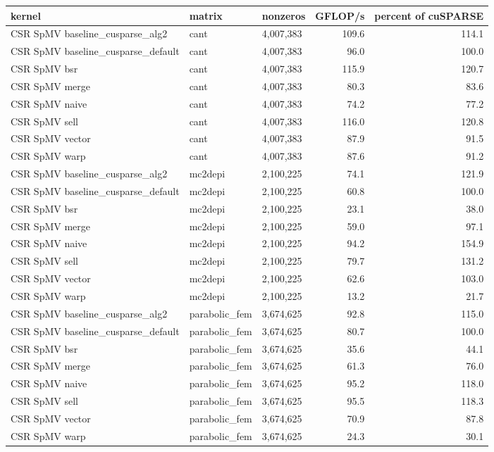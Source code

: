 \begin{tabular}{lllrr}
\toprule
kernel & matrix & nonzeros & GFLOP/s & percent of cuSPARSE \\
\midrule
CSR SpMV baseline\_cusparse\_alg2 & cant & 4,007,383 & 109.6 & 114.1 \\
CSR SpMV baseline\_cusparse\_default & cant & 4,007,383 & 96.0 & 100.0 \\
CSR SpMV bsr & cant & 4,007,383 & 115.9 & 120.7 \\
CSR SpMV merge & cant & 4,007,383 & 80.3 & 83.6 \\
CSR SpMV naive & cant & 4,007,383 & 74.2 & 77.2 \\
CSR SpMV sell & cant & 4,007,383 & 116.0 & 120.8 \\
CSR SpMV vector & cant & 4,007,383 & 87.9 & 91.5 \\
CSR SpMV warp & cant & 4,007,383 & 87.6 & 91.2 \\
CSR SpMV baseline\_cusparse\_alg2 & mc2depi & 2,100,225 & 74.1 & 121.9 \\
CSR SpMV baseline\_cusparse\_default & mc2depi & 2,100,225 & 60.8 & 100.0 \\
CSR SpMV bsr & mc2depi & 2,100,225 & 23.1 & 38.0 \\
CSR SpMV merge & mc2depi & 2,100,225 & 59.0 & 97.1 \\
CSR SpMV naive & mc2depi & 2,100,225 & 94.2 & 154.9 \\
CSR SpMV sell & mc2depi & 2,100,225 & 79.7 & 131.2 \\
CSR SpMV vector & mc2depi & 2,100,225 & 62.6 & 103.0 \\
CSR SpMV warp & mc2depi & 2,100,225 & 13.2 & 21.7 \\
CSR SpMV baseline\_cusparse\_alg2 & parabolic\_fem & 3,674,625 & 92.8 & 115.0 \\
CSR SpMV baseline\_cusparse\_default & parabolic\_fem & 3,674,625 & 80.7 & 100.0 \\
CSR SpMV bsr & parabolic\_fem & 3,674,625 & 35.6 & 44.1 \\
CSR SpMV merge & parabolic\_fem & 3,674,625 & 61.3 & 76.0 \\
CSR SpMV naive & parabolic\_fem & 3,674,625 & 95.2 & 118.0 \\
CSR SpMV sell & parabolic\_fem & 3,674,625 & 95.5 & 118.3 \\
CSR SpMV vector & parabolic\_fem & 3,674,625 & 70.9 & 87.8 \\
CSR SpMV warp & parabolic\_fem & 3,674,625 & 24.3 & 30.1 \\

\end{tabular}
